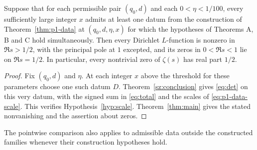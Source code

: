 \begin{corollary}\label{cor:construction-grh}
Suppose that for each permissible pair $(q_0,d)$ and each $0<\eta<1/100$,
every sufficiently large integer $x$ admits at least one datum from
the construction of Theorem~\ref{thm:p1-data} at $(q_0,d,\eta,x)$
for which the hypotheses of Theorems A, B and C hold simultaneously.
Then every Dirichlet $L$-function is nonzero in $\Re s>1/2$, with the
principal pole at $1$ excepted, and its zeros in $0<\Re s<1$ lie on
$\Re s=1/2$. In particular, every nontrivial zero of $\zeta(s)$ has real
part $1/2$.
\end{corollary}
\begin{proof}
Fix $(q_0,d)$ and $\eta$. At each integer $x$ above the threshold for these
parameters choose one such datum $D$. Theorem~\ref{sz:conclusion} gives
\eqref{eq:det} on this very datum, with the signed sum in
\eqref{eq:total} and the scales of \eqref{eq:p1-data-scale}.
This verifies Hypothesis~\ref{hyp:scale}. Theorem~\ref{thm:main} gives
the stated nonvanishing and the assertion about zeros.
\end{proof}

The pointwise comparison also applies to admissible data outside the
constructed families whenever their construction hypotheses hold.

